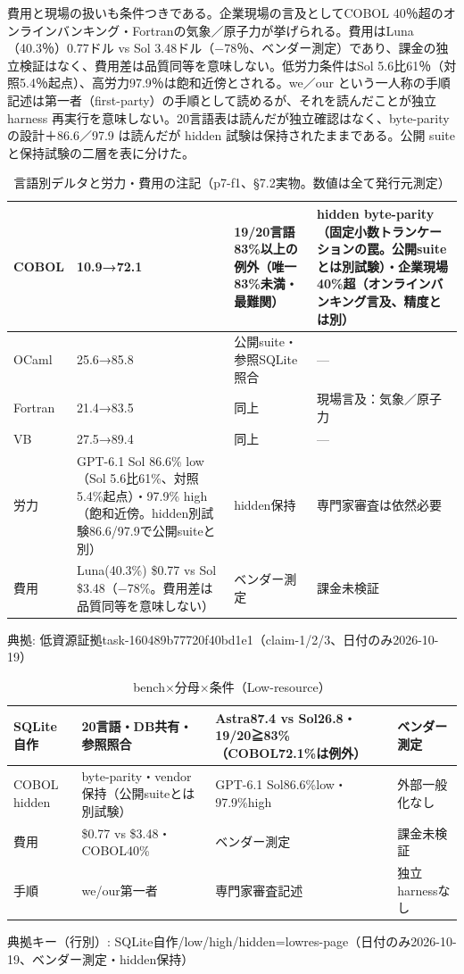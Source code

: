 \documentclass[lualatex,a4paper,10pt]{jlreq}
\begin{document}
費用と現場の扱いも条件つきである。企業現場の言及としてCOBOL 40％超のオンラインバンキング・Fortranの気象／原子力が挙げられる。費用はLuna（40.3％）0.77ドル vs Sol 3.48ドル（−78％、ベンダー測定）であり、課金の独立検証はなく、費用差は品質同等を意味しない。低労力条件はSol 5.6比61％（対照5.4％起点）、高労力97.9％は飽和近傍とされる。we／our という一人称の手順記述は第一者（first-party）の手順として読めるが、それを読んだことが独立 harness 再実行を意味しない。20言語表は読んだが独立確認はなく、byte-parity の設計＋86.6／97.9 は読んだが hidden 試験は保持されたままである。公開 suite と保持試験の二層を表に分けた。


\begin{table}[htbp]\centering\footnotesize
\caption{言語別デルタと労力・費用の注記（p7-f1、§7.2実物。数値は全て発行元測定）}
\begin{tabularx}{0.96\linewidth}{@{}lXXX@{}}
\toprule
COBOL & 10.9→72.1 & 19/20言語83\%以上の例外（唯一83\%未満・最難関） & hidden byte-parity（固定小数トランケーションの罠。公開suiteとは別試験）・企業現場40\%超（オンラインバンキング言及、精度とは別） \\
\midrule
OCaml & 25.6→85.8 & 公開suite・参照SQLite照合 & — \\
Fortran & 21.4→83.5 & 同上 & 現場言及：気象／原子力 \\
VB & 27.5→89.4 & 同上 & — \\
労力 & GPT-6.1 Sol 86.6\% low（Sol 5.6比61\%、対照5.4\%起点）・97.9\% high（飽和近傍。hidden別試験86.6/97.9で公開suiteと別） & hidden保持 & 専門家審査は依然必要 \\
費用 & Luna(40.3\%) \$0.77 vs Sol \$3.48（−78\%。費用差は品質同等を意味しない） & ベンダー測定 & 課金未検証 \\
\bottomrule
\end{tabularx}
{\scriptsize\color{SurveyMuted} 典拠: 低資源証拠task-160489b77720f40bd1e1（claim-1/2/3、日付のみ2026-10-19）\par}
\end{table}


\begin{table}[htbp]\centering\footnotesize
\caption{bench×分母×条件（Low-resource）}
\begin{tabularx}{0.96\linewidth}{@{}lXXX@{}}
\toprule
SQLite自作 & 20言語・DB共有・参照照合 & Astra87.4 vs Sol26.8・19/20≧83\%（COBOL72.1\%は例外） & ベンダー測定 \\
\midrule
COBOL hidden & byte-parity・vendor保持（公開suiteとは別試験） & GPT-6.1 Sol86.6\%low・97.9\%high & 外部一般化なし \\
費用 & \$0.77 vs \$3.48・COBOL40\% & ベンダー測定 & 課金未検証 \\
手順 & we/our第一者 & 専門家審査記述 & 独立harnessなし \\
\bottomrule
\end{tabularx}
{\scriptsize\color{SurveyMuted} 典拠キー（行別）: SQLite自作/low/high/hidden=lowres-page（日付のみ2026-10-19、ベンダー測定・hidden保持）\par}
\end{table}
\end{document}

